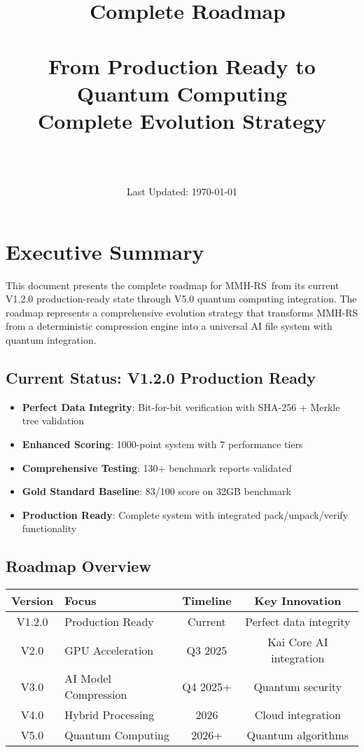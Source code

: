 \documentclass[12pt,a4paper]{article}
\title{\Huge\textbf{\project\ Complete Roadmap}\\[0.5cm]
\Large\textbf{\version}\\[0.3cm]
\large From Production Ready to Quantum Computing\\[0.5cm]
\large Complete Evolution Strategy}
\author{\Large\authorname\\[0.2cm]\email\\[0.2cm]\github}
\date{\large Last Updated: \today}
\newcommand{\project}{MMH-RS}
\begin{document}
\maketitle
\thispagestyle{empty}

\tableofcontents
\newpage

\section{Executive Summary}

This document presents the complete roadmap for \project\ from its current V1.2.0 production-ready state through V5.0 quantum computing integration. The roadmap represents a comprehensive evolution strategy that transforms MMH-RS from a deterministic compression engine into a universal AI file system with quantum integration.

\subsection{Current Status: V1.2.0 Production Ready}
\begin{itemize}
    \item \textbf{Perfect Data Integrity}: Bit-for-bit verification with SHA-256 + Merkle tree validation
    \item \textbf{Enhanced Scoring}: 1000-point system with 7 performance tiers
    \item \textbf{Comprehensive Testing}: 130+ benchmark reports validated
    \item \textbf{Gold Standard Baseline}: 83/100 score on 32GB benchmark
    \item \textbf{Production Ready}: Complete system with integrated pack/unpack/verify functionality
\end{itemize}

\subsection{Roadmap Overview}
\begin{center}
\begin{tabular}{|c|l|c|c|}
\hline
\textbf{Version} & \textbf{Focus} & \textbf{Timeline} & \textbf{Key Innovation} \\
\hline
V1.2.0 & Production Ready & Current & Perfect data integrity \\
V2.0 & GPU Acceleration & Q3 2025 & Kai Core AI integration \\
V3.0 & AI Model Compression & Q4 2025+ & Quantum security \\
V4.0 & Hybrid Processing & 2026 & Cloud integration \\
V5.0 & Quantum Computing & 2026+ & Quantum algorithms \\
\hline
\end{tabular}
\end{center}
\end{document}
